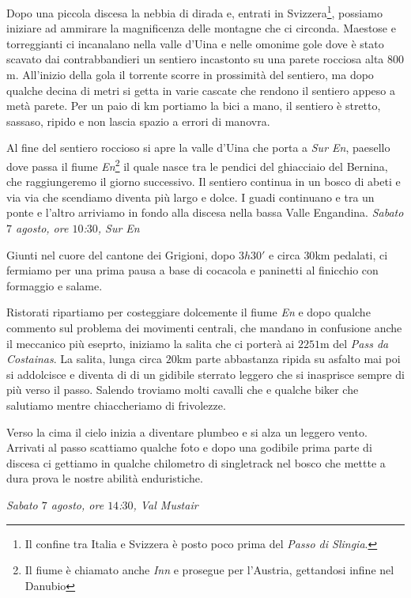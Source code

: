 Dopo una piccola discesa la nebbia di dirada e, entrati in Svizzera\footnote{Il confine tra Italia e Svizzera è posto poco prima del \emph{Passo di Slingia}.}, possiamo iniziare ad ammirare la magnificenza delle montagne che ci circonda.
Maestose e torreggianti ci incanalano nella valle d'Uina e nelle omonime gole dove è stato scavato dai contrabbandieri un sentiero incastonto su una parete rocciosa alta $800$m.
All'inizio della gola il torrente scorre in prossimità del sentiero, ma dopo qualche decina di metri si getta in varie cascate che rendono il sentiero appeso a metà parete.
Per un paio di km portiamo la bici a mano, il sentiero è stretto, sassaso, ripido e non lascia spazio a errori di manovra.

Al fine del sentiero roccioso si apre la valle d'Uina che porta a \emph{Sur En}, paesello dove passa il fiume \emph{En}\footnote{Il fiume è chiamato anche \emph{Inn} e prosegue per l'Austria, gettandosi infine nel Danubio} il quale nasce tra le pendici del ghiacciaio del Bernina, che raggiungeremo il giorno successivo.
Il sentiero continua in un bosco di abeti e via via che scendiamo diventa più largo e dolce.
I guadi continuano e tra un ponte e l'altro arriviamo in fondo alla discesa nella bassa Valle Engandina.
\vspace{2mm}
\emph{Sabato $7$ agosto, ore $10$:$30$, Sur En} 
\vspace{2mm}

Giunti nel cuore del cantone dei Grigioni, dopo $3h30'$ e circa $30$km pedalati, ci fermiamo per una prima pausa a base di cocacola e paninetti al finicchio con formaggio e salame.

Ristorati ripartiamo per costeggiare dolcemente il fiume \emph{En} e dopo qualche commento sul problema dei movimenti centrali, che mandano in confusione anche il meccanico più eseprto, iniziamo la salita che ci porterà ai $2251$m del \emph{Pass da Costainas}.
La salita, lunga circa $20$km parte abbastanza ripida su asfalto mai poi si addolcisce e diventa di di un gidibile sterrato leggero che si inasprisce sempre di più verso il passo.
Salendo troviamo molti cavalli che e qualche biker che salutiamo mentre chiaccheriamo di frivolezze.

Verso la cima il cielo inizia a diventare plumbeo e si alza un leggero vento.
Arrivati al passo scattiamo qualche foto e dopo una godibile prima parte di discesa ci gettiamo in qualche chilometro di singletrack nel bosco che mettte a dura prova le nostre abilità enduristiche.

\vspace{2mm}
\emph{Sabato $7$ agosto, ore $14$:$30$, Val Mustair} 
\vspace{2mm}

